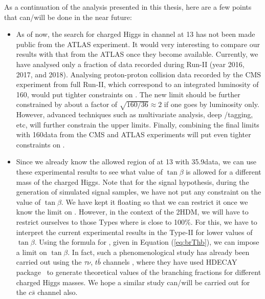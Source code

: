 As a continuation of the analysis presented in this thesis, here are a few points that 
can/will be done in the near future: 
\begin{itemize}[leftmargin=*]
\item As of now, the search for charged Higgs in \brHcs channel at 13 \TeV has not been made public 
from the ATLAS experiment. It would very interesting to compare our results with that from the ATLAS 
once they become available. Currently, we have analysed only a fraction of data recorded during
Run-II (year 2016, 2017, and 2018). Analysing proton-proton collision data recorded by the 
CMS experiment from full Run-II, which correspond to an integrated luminosity of 160\fbinv, 
would put tighter constraints on \brThb. The new limit should be further constrained by about a 
factor of $\sqrt{160/36}\approx 2$ if one goes by luminosity only. However, advanced
techniques such as multivariate analysis, deep \PQb/\PQc tagging, etc, will further constrain
the upper limits. Finally, combining the final limits with 160\fbinv data from the CMS and 
ATLAS experiments will put even tighter constraints on \brThb. 

\item Since we already know the allowed region of \brThb at 13 \TeV with 35.9\fbinv data, we can
use these experimental results to see what value of $\tan\beta$ is allowed for a different 
mass of the charged Higgs. Note that for the signal hypothesis, during the generation of 
simulated signal samples, we have not put any constraint on the value of $\tan\beta$. We have
kept it floating so that we can restrict it once we know the limit on \brThb. However, in the
context of the 2HDM,  we will have to restrict ourselves to those Types where \brHcs is close to
100\%. For this, we have to interpret the current experimental results in the Type-II for lower
values of $\tan\beta$. Using the formula for \brThb, given in Equation (\ref{eq:brThb}), we can impose
a limit on $\tan\beta$. In fact, such
a phenomenological study has already been carried out using the $\tau\nu$, $t\bar{b}$ channels
\cite{Sanyal:2019xcp}, where they have used \rm{HDECAY} package~\cite{Djouadi:1997yw} to generate 
theoretical values of the branching fractions for different charged Higgs masses. We hope a similar 
study can/will be carried out for the $c\bar{s}$ channel also. 


\end{itemize}
